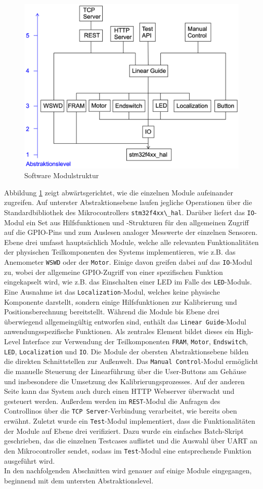 \begin{figure}[H]
	\centering
	\includegraphics[width=0.6\linewidth]{images/Software/Modulestructure.png}
	\caption{Software Modulstruktur}
	\label{fig:modulestructure}
\end{figure}
\noindent
Abbildung \ref{fig:modulestructure} zeigt abwärtsgerichtet, wie die einzelnen Module aufeinander zugreifen. Auf unterster Abstraktionsebene laufen jegliche Operationen über die Standardbibliothek des Mikrocontrollers \verb|stm32f4xx\_hal|. Darüber liefert das \verb|IO|-Modul ein Set aus Hilfsfunktionen und -Strukturen für den allgemeinen Zugriff auf die GPIO-Pins und zum Auslesen analoger Messwerte der einzelnen Sensoren. Ebene drei umfasst hauptsächlich Module, welche alle relevanten Funktionalitäten der physischen Teilkomponenten des Systems implementieren, wie z.B. das Anemometer \verb|WSWD| oder der \verb|Motor|. Einige davon greifen dabei auf das \verb|IO|-Modul zu, wobei der allgemeine GPIO-Zugriff von einer spezifischen Funktion eingekapselt wird, wie z.B. das Einschalten einer LED im Falle des \verb|LED|-Moduls. Eine Ausnahme ist das \verb|Localization|-Modul, welches keine physische Komponente darstellt, sondern einige Hilfsfunktionen zur Kalibrierung und Positionsberechnung bereitstellt. Während die Module bis Ebene drei überwiegend allgemeingültig entworfen sind, enthält das \verb|Linear Guide|-Modul anwendungsspezifische Funktionen. Als zentrales Element bildet dieses ein High-Level Interface zur Verwendung der Teilkomponenten \verb|FRAM|, \verb|Motor|, \verb|Endswitch|, \verb|LED|, \verb|Localization| und \verb|IO|. Die Module der obersten Abstraktionsebene bilden die direkten Schnittstellen zur Außenwelt. Das \verb|Manual Control|-Modul ermöglicht die manuelle Steuerung der Linearführung über die User-Buttons am Gehäuse und insbesondere die Umsetzung des Kalibrierungsprozesses. Auf der anderen Seite kann das System auch durch einen HTTP Webserver überwacht und gesteuert werden. Außerdem werden im \verb|REST|-Modul die Anfragen des Controllinos über die \verb|TCP Server|-Verbindung verarbeitet, wie bereits oben erwähnt. Zuletzt wurde ein \verb|Test|-Modul implementiert, dass die Funktionalitäten der Module auf Ebene drei verifiziert. Dazu wurde ein einfaches Batch-Skript geschrieben, das die einzelnen Testcases auflistet und die Auswahl über UART an den  Mikrocontroller sendet, sodass im \verb|Test|-Modul eine entsprechende Funktion ausgeführt wird.\\In den nachfolgenden Abschnitten wird genauer auf einige Module eingegangen, beginnend mit dem untersten Abstraktionslevel.

